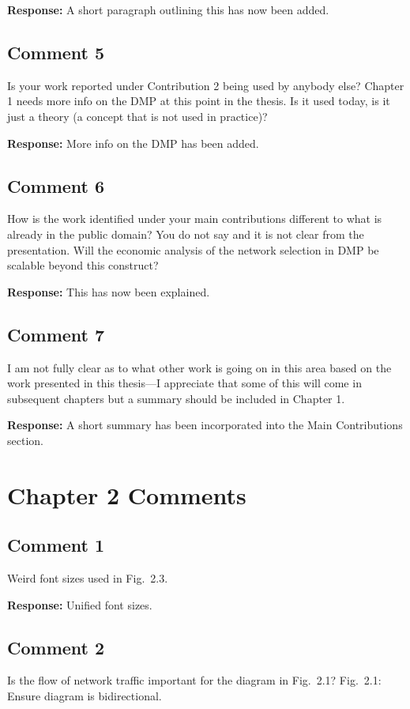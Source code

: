 \documentclass[10pt,a4paper,notitlepage]{article}
\numberwithin{equation}{section}
\begin{document}
\textbf{Response:}
A short paragraph outlining this has now been added.

\subsection{Comment 5}
Is your work reported under Contribution 2 being used by anybody else? Chapter 1 needs more info on the DMP at this point in the thesis. Is it used today, is it just a theory (a concept that is not used in practice)?

\textbf{Response:}
More info on the DMP has been added.

\subsection{Comment 6}
How is the work identified under your main contributions different to what is already in the public domain? You do not say and it is not clear from the presentation. Will the economic analysis of the network selection in DMP be scalable beyond this construct?


\textbf{Response:}
This has now been explained.

\subsection{Comment 7}
I am not fully clear as to what other work is going on in this area based on the work presented in this thesis---I appreciate that some of this will come in subsequent chapters but a summary should be included in Chapter 1.

\textbf{Response:}
A short summary has been incorporated into the Main Contributions section.

\clearpage

\section{Chapter 2 Comments}
\subsection{Comment 1}
Weird font sizes used in Fig.~2.3.

\textbf{Response:}
Unified font sizes.

\subsection{Comment 2}
Is the flow of network traffic important for the diagram in Fig.~2.1? Fig.~2.1: Ensure diagram is bidirectional.
\end{document}
